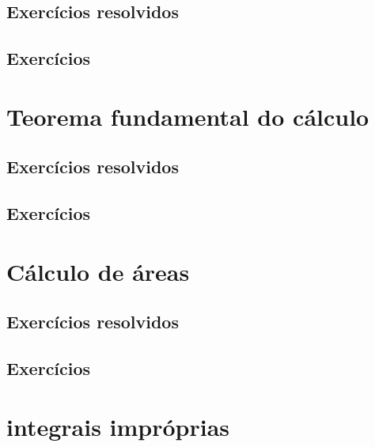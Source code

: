 \subsection*{Exercícios resolvidos}

\construirExeresol


\subsection*{Exercícios}

\construirExer


\section{Teorema fundamental do cálculo}
\construirSec

\subsection*{Exercícios resolvidos}

\construirExeresol


\subsection*{Exercícios}

\construirExer


\section{Cálculo de áreas}
\construirSec

\subsection*{Exercícios resolvidos}

\construirExeresol


\subsection*{Exercícios}

\construirExer


\section{integrais impróprias}
\construirSec


